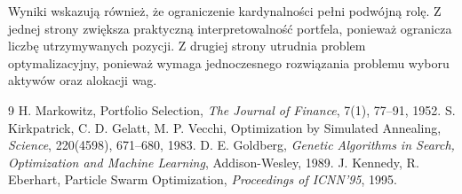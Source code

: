 \documentclass[12pt,a4paper]{article}
\begin{document}
Wyniki wskazują również, że ograniczenie kardynalności pełni podwójną rolę. Z jednej 
strony zwiększa praktyczną interpretowalność portfela, ponieważ ogranicza liczbę 
utrzymywanych pozycji. Z drugiej strony utrudnia problem optymalizacyjny, ponieważ 
wymaga jednoczesnego rozwiązania problemu wyboru aktywów oraz alokacji wag.
\newpage
\begin{thebibliography}{9}
 H. Markowitz, Portfolio Selection, \textit{The Journal of Finance}, 7(1), 77--91, 1952.
 S. Kirkpatrick, C. D. Gelatt, M. P. Vecchi, Optimization by Simulated Annealing, \textit{Science}, 220(4598), 671--680, 1983.
 D. E. Goldberg, \textit{Genetic Algorithms in Search, Optimization and Machine Learning}, Addison-Wesley, 1989.
 J. Kennedy, R. Eberhart, Particle Swarm Optimization, \textit{Proceedings of ICNN'95}, 1995.
\end{thebibliography}
\end{document}
